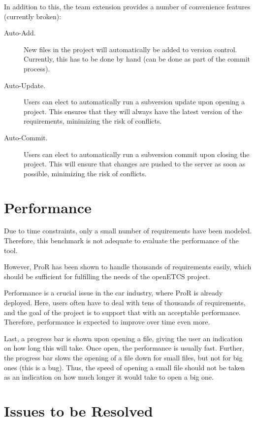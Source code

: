 \documentclass{template/openetcs_report}
\begin{document}
In addition to this, the team extension provides a number of convenience features (currently broken):

\begin{description}
\item[Auto-Add.] New files in the project will automatically be added to version control.  Currently, this has to be done by hand (can be done as part of the commit process).
\item[Auto-Update.] Users can elect to automatically run a subversion update upon opening a project.  This ensures that they will always have the latest version of the requirements, minimizing the risk of conflicts.
\item[Auto-Commit.] Users can elect to automatically run a subversion commit upon closing the project.  This will ensure that changes are pushed to the server as soon as possible, minimizing the risk of conflicts.
\end{description}

\section{Performance}
\label{sec:performance}

Due to time constraints, only a small number of requirements have been modeled.  Therefore, this benchmark is not adequate to evaluate the performance of the tool.

However, ProR has been shown to handle thousands of requirements easily, which should be sufficient for fulfilling the needs of the openETCS project.

Performance is a crucial issue in the car industry, where ProR is already deployed.  Here, users often have to deal with tens of thousands of requirements, and the goal of the project is to support that with an acceptable performance.  Therefore, performance is expected to improve over time even more.

Last, a progress bar is shown upon opening a file, giving the user an indication on how long this will take.  Once open, the performance is usually fast.  Further, the progress bar slows the opening of a file down for small files, but not for big ones (this is a bug).  Thus, the speed of opening a small file should not be taken as an indication on how much longer it would take to open a big one.

\section{Issues to be Resolved}
\end{document}
